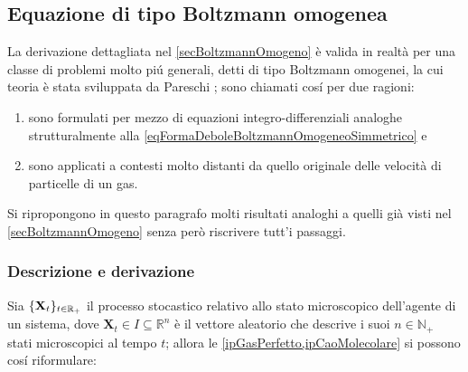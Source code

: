         \subsection{Equazione di tipo Boltzmann omogenea}\label{secTipoBoltzmannOmogeno}

            La derivazione dettagliata nel \cref{secBoltzmannOmogeno} è valida in realtà per una classe di problemi molto piú generali, detti di tipo Boltzmann omogenei, la cui teoria è stata sviluppata da Pareschi \etal{} \cite{PareschiIMS2013}; sono chiamati cosí per due ragioni:

            \begin{enumerate}[
                label=\arabic*.,
                topsep=0.5em,
                parsep=0em,
                itemsep=0.25em,
                leftmargin=2em,
                rightmargin=1.5em,
            ]
                \item sono formulati per mezzo di equazioni integro-differenziali analoghe strutturalmente alla \ref{eqFormaDeboleBoltzmannOmogeneoSimmetrico} e
                \item sono applicati a contesti\footnotemark{} molto distanti da quello originale delle velocità di particelle di un gas.
            \end{enumerate}
            
            Si ripropongono in questo paragrafo molti risultati analoghi a quelli già visti nel \cref{secBoltzmannOmogeno} senza però riscrivere tutt'i passaggi.

            \subsubsection{Descrizione e derivazione}

                Sia \(\{\mathbf X_t\}_{t\in\mathbb R_+}\) il processo stocastico relativo allo stato microscopico dell'agente di un sistema, dove \(\mathbf X_t\in I\subseteq\mathbb R^n\) è il vettore aleatorio\footnotemark{} che descrive i suoi \(n\in\mathbb N_+\) stati microscopici al tempo \(t\); allora le \cref{ipGasPerfetto,ipCaoMolecolare} si possono cosí riformulare:%

